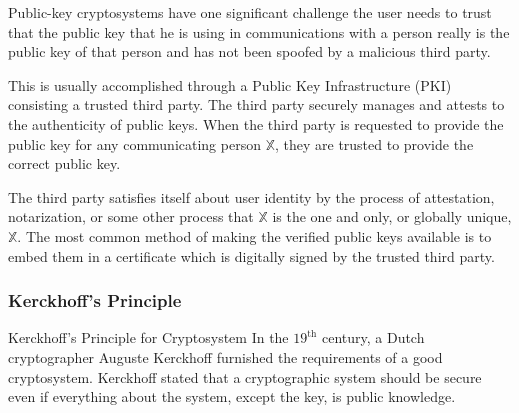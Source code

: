 \documentclass[british]{article}
\begin{document}
Public-key cryptosystems have one significant challenge \textminus{}
the user needs to trust that the public key that he is using in communications
with a person really is the public key of that person and has not
been spoofed by a malicious third party.

This is usually accomplished through a Public Key Infrastructure (PKI)
consisting a trusted third party. The third party securely manages
and attests to the authenticity of public keys. When the third party
is requested to provide the public key for any communicating person
$\mathbb{X}$, they are trusted to provide the correct public key.

The third party satisfies itself about user identity by the process
of attestation, notarization, or some other process \textminus{} that
$\mathbb{X}$ is the one and only, or globally unique, $\mathbb{X}$.
The most common method of making the verified public keys available
is to embed them in a certificate which is digitally signed by the
trusted third party.

\subsubsection{Kerckhoff\textquoteright s Principle}

Kerckhoff\textquoteright s Principle for Cryptosystem In the $19^{\text{th}}$
century, a Dutch cryptographer Auguste Kerckhoff furnished the requirements
of a good cryptosystem. Kerckhoff stated that a cryptographic system
should be secure even if everything about the system, except the key,
is public knowledge. 
\end{document}
